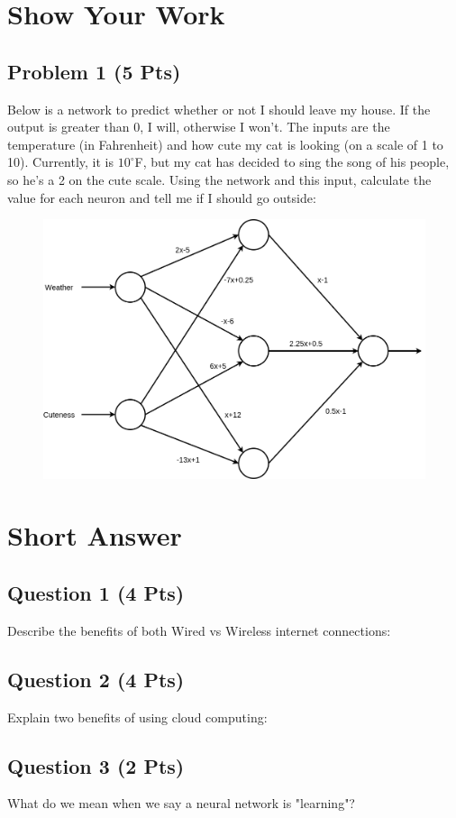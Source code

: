 \documentclass{article}
\begin{document}
\newpage
\section{Show Your Work}
\subsection*{Problem 1 (5 Pts)}
Below is a network to predict whether or not I should leave my house. If the output is greater than 0, I will, otherwise I won't. The inputs are the temperature (in Fahrenheit) and how cute my cat is looking (on a scale of 1 to 10). Currently, it is $10^{\circ}$F, but my cat has decided to sing the song of his people, so he's a 2 on the cute scale. Using the network and this input, calculate the value for each neuron and tell me if I should go outside:

\begin{figure}[h]
    \includegraphics[width=\linewidth]{network.png}
    \label{fig:1}
\end{figure}
\newpage

\section{Short Answer}
\subsection*{Question 1 (4 Pts)}
Describe the benefits of both Wired vs Wireless internet connections:
\\[3.5in]

\subsection*{Question 2 (4 Pts)}
Explain two benefits of using cloud computing:

\newpage

\subsection*{Question 3 (2 Pts)}
What do we mean when we say a neural network is "learning"?
\end{document}
